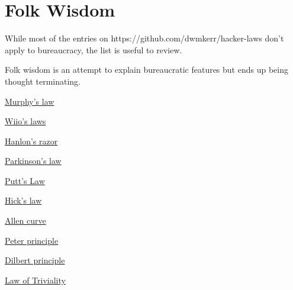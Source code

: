 \section{Folk Wisdom}
While most of the entries on
 https://github.com/dwmkerr/hacker-laws
don't apply to bureaucracy, the list is useful to review. 

Folk wisdom is an attempt to explain bureaucratic features but ends up being \gls{thought terminating}.

\href{https://en.wikipedia.org/wiki/Murphy\%27s_law}{Murphy's law}

\href{https://en.wikipedia.org/wiki/Wiio\%27s_laws}{Wiio's laws}

\href{https://en.wikipedia.org/wiki/Hanlon\%27s_razor}{Hanlon's razor}

\href{https://en.wikipedia.org/wiki/Parkinson\%27s_law}{Parkinson's law}

\href{https://en.wikipedia.org/wiki/Putt\%27s_Law_and_the_Successful_Technocrat}{Putt's Law}

\href{https://en.wikipedia.org/wiki/Hick\%27s_law}{Hick's law}

\href{https://en.wikipedia.org/wiki/Allen_curve}{Allen curve}

\href{https://en.wikipedia.org/wiki/Peter_principle}{Peter principle}

\href{https://en.wikipedia.org/wiki/Dilbert_principle}{Dilbert principle}

\href{https://en.wikipedia.org/wiki/Law_of_triviality}{Law of Triviality}